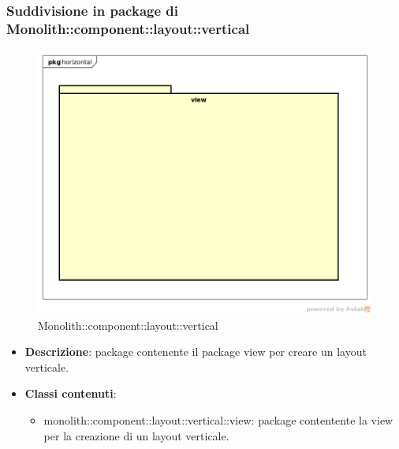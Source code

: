 \subsubsection{Suddivisione in package  di Monolith::component::layout::vertical}
\label{Monolith::component::layout::vertical}
\begin{figure}[H]
	\centering
	\includegraphics[scale=0.5]{Sezioni/imgPackage/component_layout_vertical.png}
	\caption{Monolith::component::layout::vertical}
\end{figure}
\begin{itemize}
	\item{\textbf{Descrizione}}: package contenente il package view per creare un layout verticale.
	\item{\textbf{Classi contenuti}}:
	\begin{itemize}
	\item{monolith::component::layout::vertical::view}: package contentente la view per la creazione di un layout verticale.
	\end{itemize}
\end{itemize}

